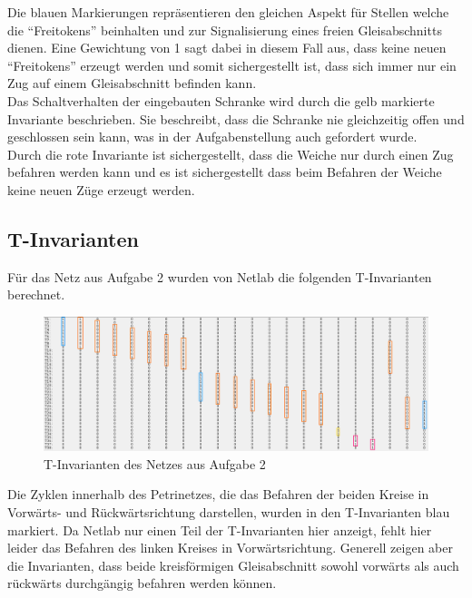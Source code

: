\documentclass[10pt]{scrartcl}
\begin{document}
Die blauen Markierungen repräsentieren den gleichen Aspekt für Stellen welche die "`Freitokens"' beinhalten und zur Signalisierung eines freien Gleisabschnitts dienen.
Eine Gewichtung von 1 sagt dabei in diesem Fall aus, dass keine neuen "`Freitokens"' erzeugt werden und somit sichergestellt ist, dass sich immer nur ein Zug auf einem Gleisabschnitt befinden kann.\\

Das Schaltverhalten der eingebauten Schranke wird durch die gelb markierte Invariante beschrieben.
Sie beschreibt, dass die Schranke nie gleichzeitig offen und geschlossen sein kann, was in der Aufgabenstellung auch gefordert wurde.\\

Durch die rote Invariante ist sichergestellt, dass die Weiche nur durch einen Zug befahren werden kann und es ist sichergestellt dass beim Befahren der Weiche keine neuen Züge erzeugt werden.

\subsection{T-Invarianten}
Für das Netz aus Aufgabe 2 wurden von Netlab die folgenden T-Invarianten berechnet.

\begin{figure}[htbp]
	\centering	\includegraphics[width=1.0\textwidth]{Bilder/t_invarianten.png}
	\caption{T-Invarianten des Netzes aus Aufgabe 2}
	\label{fig:T_invarianten}
\end{figure}

Die Zyklen innerhalb des Petrinetzes, die das Befahren der beiden Kreise in Vorwärts- und Rückwärtsrichtung darstellen, wurden in den T-Invarianten blau markiert.
Da Netlab nur einen Teil der T-Invarianten hier anzeigt, fehlt hier leider das Befahren des linken Kreises in Vorwärtsrichtung.
Generell zeigen aber die Invarianten, dass beide kreisförmigen Gleisabschnitt sowohl vorwärts als auch rückwärts durchgängig befahren werden können.\\
\end{document}

